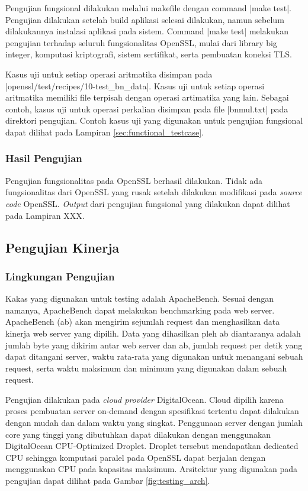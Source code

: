 Pengujian fungsional dilakukan melalui makefile dengan command |make test|. Pengujian dilakukan setelah build aplikasi selesai dilakukan, namun sebelum dilakukannya instalasi aplikasi pada sistem. Command |make test| melakukan pengujian terhadap seluruh fungsionalitas OpenSSL, mulai dari library big integer, komputasi kriptografi, sistem sertifikat, serta pembuatan koneksi TLS.

Kasus uji untuk setiap operasi aritmatika disimpan pada |openssl/test/recipes/10-test_bn_data|. Kasus uji untuk setiap operasi aritmatika memiliki file terpisah dengan operasi artimatika yang lain. Sebagai contoh, kasus uji untuk operasi perkalian disimpan pada file |bnmul.txt| pada direktori pengujian. Contoh kasus uji yang digunakan untuk pengujian fungsional dapat dilihat pada Lampiran \ref{sec:functional_testcase}.

\subsubsection{Hasil Pengujian}
Pengujian fungsionalitas pada OpenSSL berhasil dilakukan. Tidak ada fungsionalitas dari OpenSSL yang rusak setelah dilakukan modifikasi pada \textit{source code} OpenSSL. \textit{Output} dari pengujian fungsional yang dilakukan dapat dilihat pada Lampiran XXX. 

\subsection{Pengujian Kinerja}

\subsubsection{Lingkungan Pengujian}

Kakas yang digunakan untuk testing adalah ApacheBench. Sesuai dengan namanya, ApacheBench dapat melakukan benchmarking pada web server. ApacheBench (ab) akan mengirim sejumlah request dan menghasilkan data kinerja web server yang dipilih. Data yang dihasilkan pleh ab diantaranya adalah jumlah byte yang dikirim antar web server dan ab, jumlah request per detik yang dapat ditangani server, waktu rata-rata yang digunakan untuk menangani sebuah request, serta waktu maksimum dan minimum yang digunakan dalam sebuah request.

Pengujian dilakukan pada \textit{cloud provider} DigitalOcean. Cloud dipilih karena proses pembuatan server on-demand dengan spesifikasi tertentu dapat dilakukan dengan mudah dan dalam waktu yang singkat. Penggunaan server dengan jumlah core yang tinggi yang dibutuhkan dapat dilakukan dengan menggunakan DigitalOcean CPU-Optimized Droplet. Droplet tersebut mendapatkan dedicated CPU sehingga komputasi paralel pada OpenSSL dapat berjalan dengan menggunakan CPU pada kapasitas maksimum. Arsitektur yang digunakan pada pengujian dapat dilihat pada Gambar \ref{fig:testing_arch}.

